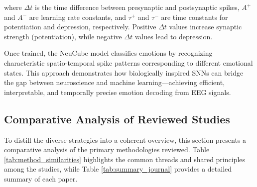 \documentclass[conference]{IEEEtran}
\begin{document}
where \(\Delta t\) is the time difference between presynaptic and postsynaptic spikes, \(A^+\) and \(A^-\) are learning rate constants, and \(\tau^+\) and \(\tau^-\) are time constants for potentiation and depression, respectively. Positive \(\Delta t\) values increase synaptic strength (potentiation), while negative \(\Delta t\) values lead to depression.

Once trained, the NeuCube model classifies emotions by recognizing characteristic spatio-temporal spike patterns corresponding to different emotional states. This approach demonstrates how biologically inspired SNNs can bridge the gap between neuroscience and machine learning—achieving efficient, interpretable, and temporally precise emotion decoding from EEG signals.


\subsection{Comparative Analysis of Reviewed Studies}
To distill the diverse strategies into a coherent overview, this section presents a comparative analysis of the primary methodologies reviewed. Table \ref{tab:method_similarities} highlights the common threads and shared principles among the studies, while Table \ref{tab:summary_journal} provides a detailed summary of each paper.
\end{document}
